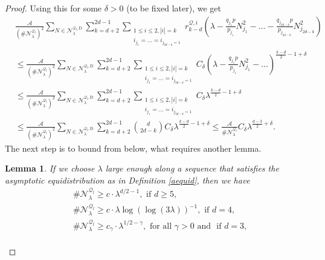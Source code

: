 \documentclass{amsart}
\newtheorem{lemma}[theorem]{Lemma}
\theoremstyle{definition}
\theoremstyle{remark}
\renewcommand\leq\leqslant
\renewcommand\geq\geqslant
\numberwithin{equation}{section}
\theoremstyle{definition}
\theoremstyle{remark}
\begin{document}
\begin{proof}
	Using this for some $\delta>0$ (to be fixed later), we get \begin{equation}
		\begin{aligned}
			&\frac{\mathcal{A}}{\left(\#\mathcal{N}_\lambda^{\mathcal{Q}_l}\right)^2}\sum_{N\in\mathcal{N}_\lambda^{\mathcal{Q}_l,\mathrm{D}}}\sum_{k=d+2}^{2d-1}\sum_{\substack{1\leq i\leq 2,|i|=k\\ i_{j_1}=\ldots=i_{j_{2d-k}=1}}}r^{\mathcal{Q},i}_{k-d}\left(\lambda-\frac{q_{j_1}p}{p_{j_1}}N_{j_1}^2-\ldots-\frac{q_{j_{2d-k}}p}{p_{j_{2d-k}}}N_{j_{2d-k}}^2\right)\\
			&\leq \frac{\mathcal{A}}{\left(\#\mathcal{N}_\lambda^{\mathcal{Q}_l}\right)^2}\sum_{N\in\mathcal{N}_\lambda^{\mathcal{Q}_l,\mathrm{D}}}\sum_{k=d+2}^{2d-1}\sum_{\substack{1\leq i\leq 2,|i|=k\\ i_{j_1}=\ldots=i_{j_{2d-k}=1}}}C_{\delta}\left(\lambda-\frac{q_{j_1}p}{p_{j_1}}N_{j_1}^2-\ldots\right)^{\frac{k-d}{2}-1+\delta}\\
			&\leq \frac{\mathcal{A}}{\left(\#\mathcal{N}_\lambda^{\mathcal{Q}_l}\right)^2}\sum_{N\in\mathcal{N}_\lambda^{\mathcal{Q}_l,\mathrm{D}}}\sum_{k=d+2}^{2d-1}\sum_{\substack{1\leq i\leq 2,|i|=k\\ i_{j_1}=\ldots=i_{j_{2d-k}=1}}}C_{\delta}\lambda ^{\frac{k-d}{2}-1+\delta}\\
			&\leq \frac{\mathcal{A}}{\left(\#\mathcal{N}_\lambda^{\mathcal{Q}_l}\right)^2}\sum_{N\in\mathcal{N}_\lambda^{\mathcal{Q}_l,\mathrm{D}}}\sum_{k=d+2}^{2d-1}\binom{d}{2d-k}C_{\delta}\lambda^{\frac{k-d}{2}-1+\delta}\leq \frac{\mathcal{A}}{\#\mathcal{N}_\lambda^{\mathcal{Q}_l}}C_\delta\lambda^{\frac{d-3}{2}+\delta}.
		\end{aligned}
	\end{equation}
	The next step is to bound from below, what requires another lemma. 
	\begin{lemma}\label{Iwaniec}
		If we choose $\lambda$ large enough along a sequence that satisfies the  asymptotic equidistribution as in Definition \ref{aequid}, then we have
		\begin{equation}
			\begin{aligned}
				&\#\mathcal{N}_\lambda^{\mathcal{Q}_l}\geq c\cdot \lambda^{d/2-1},\text{ if }d\geq 5,\\
				&\#\mathcal{N}_\lambda^{\mathcal{Q}_l}\geq c\cdot \lambda\log\left(\log(3\lambda)\right)^{-1},\text{ if }d=4,\\
				&\#\mathcal{N}_\lambda^{\mathcal{Q}_l}\geq c_\gamma\cdot \lambda^{1/2-\gamma},\text{ for all }\gamma>0\text{ and }\text{ if }d=3,\\

\end{aligned}
\end{equation}
\end{lemma}
\end{proof}
\end{document}
